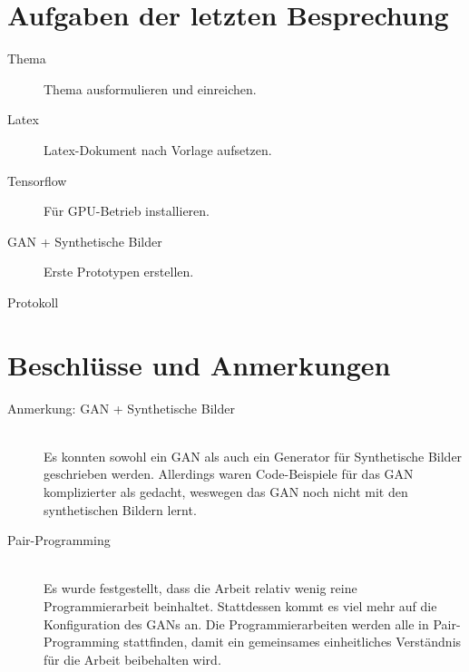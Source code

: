 
\newcommand{\Titel}{2. Protokoll}
\newcommand{\Teilnehmer}{Jonas Bürgel, Patrick Welter, Markus Reischl}
\newcommand{\DatumUndZeit}{21.10.2021 16:00-16:15}
\newcommand{\Ort}{Zoom Meeting}
\newcommand{\Thema}{Fertigstellung Prototyp und Verfassen erster Seiten zur Studienarbeit}


\section{Aufgaben der letzten Besprechung}
\begin{description}
	\item[Thema] Thema ausformulieren und einreichen. \hfill {} \fullcheck
	\item[Latex] Latex-Dokument nach Vorlage aufsetzen. \hfill {} \fullcheck
	\item[Tensorflow] Für GPU-Betrieb installieren. \hfill {} \fullcheck
	\item[GAN + Synthetische Bilder] Erste Prototypen erstellen. \hfill {} \halfcheck
	\item[Protokoll] \hfill {} \fullcheck
\end{description}

\section{Beschlüsse und Anmerkungen}
\begin{description}
	\item[Anmerkung: GAN + Synthetische Bilder] \hfill \\
	Es konnten sowohl ein GAN als auch ein Generator für Synthetische Bilder geschrieben werden. Allerdings waren Code-Beispiele für das GAN komplizierter als gedacht, weswegen das GAN noch nicht mit den synthetischen Bildern lernt.
	
	\item[Pair-Programming] \hfill \\
	Es wurde festgestellt, dass die Arbeit relativ wenig reine Programmierarbeit beinhaltet. Stattdessen kommt es viel mehr auf die Konfiguration des GANs an. Die Programmierarbeiten werden alle in Pair-Programming stattfinden, damit ein gemeinsames einheitliches Verständnis für die Arbeit beibehalten wird.
\end{description}

